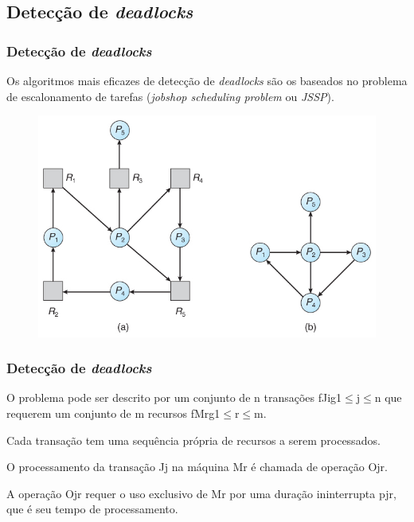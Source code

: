 \documentclass{beamer}
\begin{document}
\subsection{Detecção de \emph{deadlocks}}
\begin{frame}
    \frametitle{Detecção de \emph{deadlocks}}

    Os algoritmos mais eficazes de detecção de \emph{deadlocks} são os baseados no problema de escalonamento de tarefas (\emph{jobshop scheduling problem} ou \emph{JSSP}).

    \medskip
    \begin{figure}
        \includegraphics[width=0.8\linewidth]{deadlockdetection1.jpg}
    \end{figure}
\end{frame}

\begin{frame}
    \frametitle{Detecção de \emph{deadlocks}}

    O problema pode ser descrito por um conjunto de n transações fJig1$\leq$j$\leq$n que requerem um conjunto de m recursos fMrg1$\leq$r$\leq$m.

    \medskip
    Cada transação tem uma sequência própria de recursos a serem processados.

    \medskip
    O processamento da transação Jj na máquina Mr é chamada de operação Ojr.

    \medskip
    A operação Ojr requer o uso exclusivo de Mr por uma duração ininterrupta pjr, que é seu tempo de processamento.

\end{frame}

\end{document}
